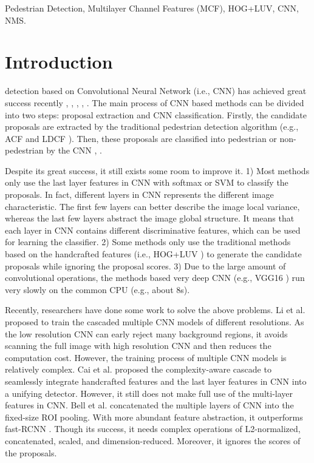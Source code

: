 \documentclass[journal]{IEEEtran}
\begin{document}
\begin{IEEEkeywords}
Pedestrian Detection, Multilayer Channel Features (MCF), HOG+LUV, CNN, NMS.
\end{IEEEkeywords}






\IEEEpeerreviewmaketitle



\section{Introduction}
 detection based on Convolutional Neural Network (i.e., CNN) has achieved great success recently \cite{Sermanet_UMFL_CVPR_2013}, \cite{Yang_CCF_ICCV_2015}, \cite{Hosang_Deeper_CVPR_2015}, \cite{Li_ScaleAware_arXiv_2015}, \cite{Benenson_TenYears_ECCV_2014}. The main process of CNN based methods can be divided into two steps: proposal extraction and CNN classification. Firstly, the candidate proposals are extracted by the traditional pedestrian detection algorithm (e.g., ACF \cite{Dollar_ACF_PAMI_2014} and LDCF \cite{Nam_LDCF_NIPS_2014}). Then, these proposals are classified into pedestrian or non-pedestrian by the CNN \cite{Hosang_Deeper_CVPR_2015}, \cite{Cai_CompACT_ICCV_2015}.
	
Despite its great success, it still exists some room to improve it. 1) Most methods only use the last layer features in CNN with softmax or SVM to classify the proposals. In fact, different layers in CNN represents the different image characteristic. The first few layers can better describe the image local variance, whereas the last few layers abstract the image global structure. It means that each layer in CNN contains different discriminative features, which can be used for learning the classifier. 2) Some methods only use the traditional methods based on the handcrafted features (i.e., HOG+LUV \cite{Dollar_ICF_BMVC_2009}) to generate the candidate proposals while ignoring the proposal scores. 3) Due to the large amount of convolutional operations, the methods based very deep CNN (e.g., VGG16 \cite{Simonyan_VGG_arXiv_2015}) run very slowly on the common CPU (e.g., about 8s).

Recently, researchers have done some work to solve the above problems. Li et al. \cite{Li_CNNC_CVPR_2015} proposed to train the cascaded multiple CNN models of different resolutions. As the low resolution CNN can early reject many background regions, it avoids scanning the full image with high resolution CNN and then reduces the computation cost. However, the training process of multiple CNN models is relatively complex. Cai et al. \cite{Cai_CompACT_ICCV_2015} proposed the complexity-aware cascade to seamlessly integrate handcrafted features and the last layer features in CNN into a unifying detector. However, it still does not make full use of the multi-layer features in CNN. Bell et al. \cite{Bell_IONet_arXiv_2015} concatenated the multiple layers of CNN into the fixed-size ROI pooling. With more abundant feature abstraction, it outperforms fast-RCNN \cite{Girshick_Fast_ICCV_2015}. Though its success, it needs complex operations of L2-normalized, concatenated, scaled, and dimension-reduced. Moreover, it ignores the scores of the proposals.
\end{document}
